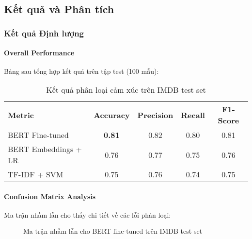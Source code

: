 \subsection{Kết quả và Phân tích}
\label{ssec:ket_qua_phan_tich}

\subsubsection{Kết quả Định lượng}

\paragraph{Overall Performance}
Bảng sau tổng hợp kết quả trên tập test (100 mẫu):

\begin{table}[H]
\centering
\caption{Kết quả phân loại cảm xúc trên IMDB test set}
\label{tab:results_summary}
\begin{tabular}{lcccc}
\toprule
\textbf{Metric} & \textbf{Accuracy} & \textbf{Precision} & \textbf{Recall} & \textbf{F1-Score} \\
\midrule
BERT Fine-tuned & \textbf{0.81} & 0.82 & 0.80 & 0.81 \\
BERT Embeddings + LR & 0.76 & 0.77 & 0.75 & 0.76 \\
TF-IDF + SVM & 0.75 & 0.76 & 0.74 & 0.75 \\
\bottomrule
\end{tabular}
\end{table}

\paragraph{Confusion Matrix Analysis}
Ma trận nhầm lẫn cho thấy chi tiết về các lỗi phân loại:

\begin{figure}[H]
\centering
{}
\caption{Ma trận nhầm lẫn cho BERT fine-tuned trên IMDB test set}
\label{fig:confusion_matrix}
\end{figure}

